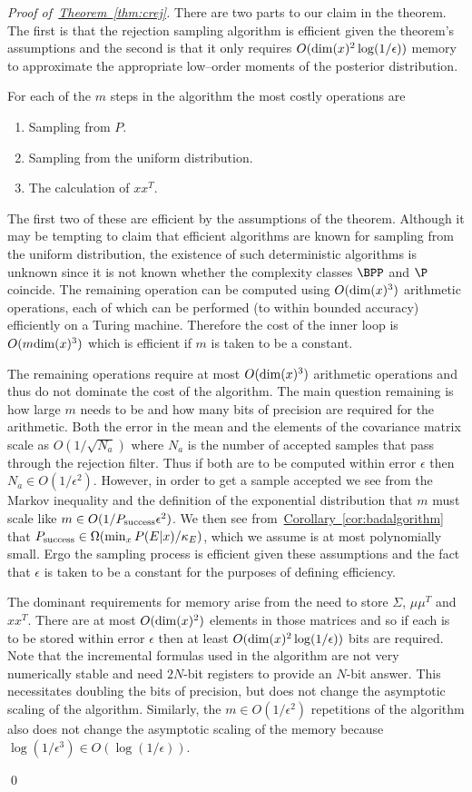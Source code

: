\documentclass[twoside]{article}
\newenvironment{proofof}[1]{\begin{trivlist}\item[]{\flushleft\it
Proof of~#1.}}
{\qed\end{trivlist}}
\newcommand{\thm}[1]{\hyperref[thm:#1]{Theorem~\ref*{thm:#1}}}
\newcommand{\cor}[1]{\hyperref[cor:#1]{Corollary~\ref*{cor:#1}}}
\begin{document}
\begin{proofof}{\thm{crej}}
There are two parts to our claim in the theorem.  The first is that the rejection sampling algorithm is efficient given the theorem's assumptions
and the second is that it only requires $O({\rm dim}(x)^2 \log(1/\epsilon))$ memory to approximate the appropriate low--order moments of
 the posterior distribution.

For each of the $m$ steps in the algorithm the most costly operations are 
\begin{enumerate}
\item Sampling from $P$.
\item Sampling from the uniform distribution.
\item The calculation of $xx^T$.
\end{enumerate}
The first two of these are efficient by the assumptions of the theorem.  Although it may be tempting to claim that efficient algorithms are known
for sampling from the uniform distribution, the existence of such deterministic algorithms is unknown since it is not known whether the complexity
classes $\BPP$ and $\P$ coincide.  The remaining operation can be computed using $O({\rm dim}(x)^3)$ arithmetic operations, each of which can
be performed (to within bounded accuracy) efficiently on a Turing machine.  Therefore the cost of the inner loop is $O(m{\rm dim}(x)^3)$ which is efficient
if $m$ is taken to be a constant.

The remaining operations require at most $O({\rm dim}(x)^3)$ arithmetic operations and thus do not dominate the cost of the algorithm.  The main question remaining
is how large $m$ needs to be and how many bits of precision are required for the arithmetic.  Both the error in the mean and the elements of the covariance matrix scale as $O(1/\sqrt{N_a})$ where $N_a$ is the number of accepted samples that pass through the rejection filter.  Thus if both are to be computed within error $\epsilon$ then $N_a \in O(1/\epsilon^2)$.  However, in order to get a sample accepted we see from the Markov inequality and the definition of the exponential distribution that $m$ must scale like $m\in O(1/P_{\rm success} \epsilon^2)$.  We then see from~\cor{badalgorithm} that $P_{\rm success} \in \Omega(\min_x P(E|x)/\kappa_E)$, which we assume is at most polynomially small.  Ergo the sampling process is efficient given these assumptions and the fact that $\epsilon$ is taken to be a constant for the purposes of defining efficiency.

The dominant requirements for memory arise from the need to store $\Sigma$, $\mu\mu^T$ and $xx^T$.  There are at most $O({\rm dim}(x)^2)$ elements in those matrices and so if each is to be stored within error $\epsilon$ then at least $O({\rm dim}(x)^2\log(1/\epsilon))$ bits are required.  Note that the incremental formulas used in the algorithm are not very numerically stable and need $2N$-bit registers to provide an $N$-bit answer.  This necessitates doubling the bits of precision, but does not change the asymptotic scaling of the algorithm.  Similarly, the $m\in O(1/\epsilon^2)$ repetitions of the algorithm also does not change the asymptotic scaling of the memory because $\log(1/\epsilon^3) \in O(\log(1/\epsilon))$.


\end{proofof}
\end{document}
